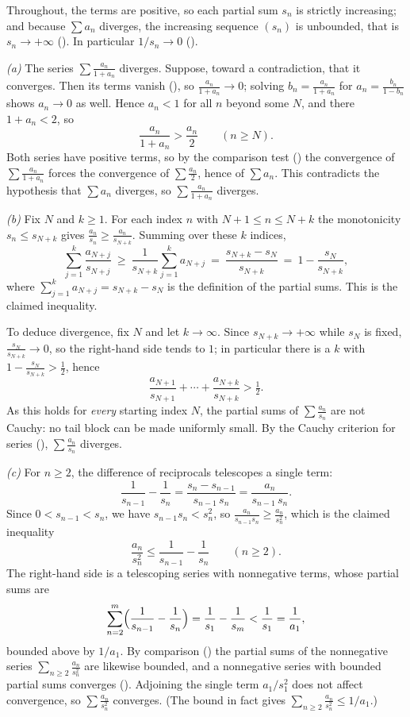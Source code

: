 \documentclass[main.tex]{subfiles}
\begin{document}
\begin{SolutionBlue}
Throughout, the terms are positive, so each partial sum $s_n$ is strictly increasing; and because
$\sum a_n$ diverges, the increasing sequence $(s_n)$ is unbounded, that is $s_n\to+\infty$
(). In particular $1/s_n\to 0$ ().

\emph{(a)} The series $\sum\frac{a_n}{1+a_n}$ diverges. Suppose, toward a contradiction, that it
converges. Then its terms vanish (), so $\frac{a_n}{1+a_n}\to 0$; solving
$b_n=\frac{a_n}{1+a_n}$ for $a_n=\frac{b_n}{1-b_n}$ shows $a_n\to 0$ as well. Hence $a_n<1$ for all $n$
beyond some $N$, and there $1+a_n<2$, so
\[
\frac{a_n}{1+a_n}>\frac{a_n}{2}\qquad(n\ge N).
\]
Both series have positive terms, so by the comparison test () the convergence of
$\sum\frac{a_n}{1+a_n}$ forces the convergence of $\sum\frac{a_n}{2}$, hence of $\sum a_n$. This
contradicts the hypothesis that $\sum a_n$ diverges, so $\sum\frac{a_n}{1+a_n}$ diverges.

\emph{(b)} Fix $N$ and $k\ge 1$. For each index $n$ with $N+1\le n\le N+k$ the monotonicity
$s_n\le s_{N+k}$ gives $\frac{a_n}{s_n}\ge\frac{a_n}{s_{N+k}}$. Summing over these $k$ indices,
\[
\sum_{j=1}^{k}\frac{a_{N+j}}{s_{N+j}}
\ \ge\ \frac{1}{s_{N+k}}\sum_{j=1}^{k}a_{N+j}
\ =\ \frac{s_{N+k}-s_N}{s_{N+k}}
\ =\ 1-\frac{s_N}{s_{N+k}},
\]
where $\sum_{j=1}^{k}a_{N+j}=s_{N+k}-s_N$ is the definition of the partial sums. This is the claimed
inequality.

To deduce divergence, fix $N$ and let $k\to\infty$. Since $s_{N+k}\to+\infty$ while $s_N$ is fixed,
$\frac{s_N}{s_{N+k}}\to 0$, so the right-hand side tends to $1$; in particular there is a $k$ with
$1-\frac{s_N}{s_{N+k}}>\tfrac12$, hence
\[
\frac{a_{N+1}}{s_{N+1}}+\cdots+\frac{a_{N+k}}{s_{N+k}}>\tfrac12 .
\]
As this holds for \emph{every} starting index $N$, the partial sums of $\sum\frac{a_n}{s_n}$ are not
Cauchy: no tail block can be made uniformly small. By the Cauchy criterion for series
(), $\sum\frac{a_n}{s_n}$ diverges.

\emph{(c)} For $n\ge 2$, the difference of reciprocals telescopes a single term:
\[
\frac{1}{s_{n-1}}-\frac{1}{s_n}=\frac{s_n-s_{n-1}}{s_{n-1}\,s_n}=\frac{a_n}{s_{n-1}\,s_n}.
\]
Since $0<s_{n-1}<s_n$, we have $s_{n-1}s_n<s_n^2$, so $\frac{a_n}{s_{n-1}s_n}\ge\frac{a_n}{s_n^2}$,
which is the claimed inequality
\[
\frac{a_n}{s_n^{2}}\le\frac{1}{s_{n-1}}-\frac{1}{s_n}\qquad(n\ge 2).
\]
The right-hand side is a telescoping series with nonnegative terms, whose partial sums are
\[
\sum_{n=2}^{m}\Bigl(\frac{1}{s_{n-1}}-\frac{1}{s_n}\Bigr)=\frac{1}{s_1}-\frac{1}{s_m}<\frac{1}{s_1}=\frac{1}{a_1},
\]
bounded above by $1/a_1$. By comparison () the partial sums of the nonnegative series
$\sum_{n\ge 2}\frac{a_n}{s_n^2}$ are likewise bounded, and a nonnegative series with bounded partial
sums converges (). Adjoining the single term $a_1/s_1^2$ does not affect convergence, so
$\sum\frac{a_n}{s_n^2}$ converges. (The bound in fact gives $\sum_{n\ge 2}\frac{a_n}{s_n^2}\le 1/a_1$.)


\end{SolutionBlue}
\end{document}

